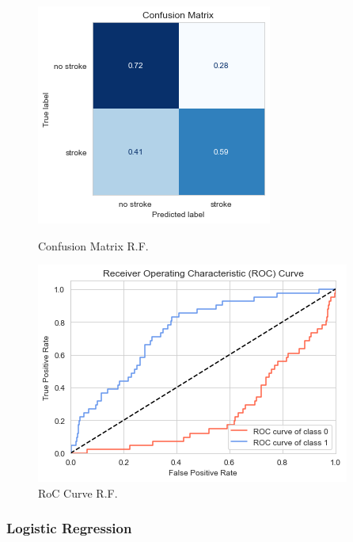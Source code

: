 \documentclass[11pt, a4paper]{article}
\begin{document}
\begin{figure}[H]
    \includegraphics[width=\textwidth]{images/randForConfMat.png}
    \caption{Confusion Matrix R.F.}
    \label{fig:randForConfMat}
\endminipage\hfill
{}
    \includegraphics[width=\textwidth]{images/rocRF.png}
    \caption{RoC Curve R.F.}
    \label{fig:RoCRF}
\endminipage\hfill
\end{figure}

\subsubsection{Logistic Regression}
\end{document}
